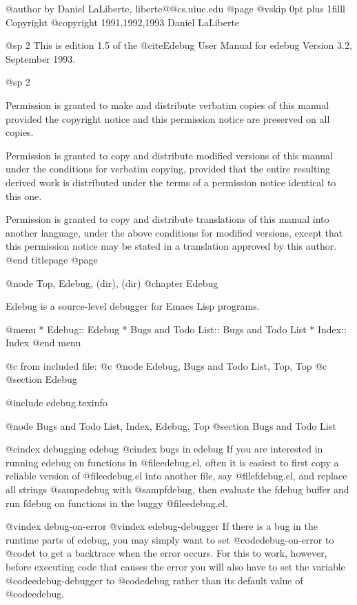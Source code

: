 @author by Daniel LaLiberte,  liberte@@cs.uiuc.edu
@page
@vskip 0pt plus 1filll
Copyright @copyright{} 1991,1992,1993 Daniel LaLiberte

@sp 2
This is edition 1.5 of the @cite{Edebug User Manual}
for edebug Version 3.2, September 1993.


@sp 2

Permission is granted to make and distribute verbatim copies of
this manual provided the copyright notice and this permission notice
are preserved on all copies.

Permission is granted to copy and distribute modified versions of this
manual under the conditions for verbatim copying, provided that the entire
resulting derived work is distributed under the terms of a permission
notice identical to this one.

Permission is granted to copy and distribute translations of this manual
into another language, under the above conditions for modified versions,
except that this permission notice may be stated in a translation approved
by this author.
@end titlepage
@page


@node Top, Edebug, (dir), (dir)
@chapter Edebug

  Edebug is a source-level debugger for Emacs Lisp programs.


@menu
* Edebug::			Edebug
* Bugs and Todo List::		Bugs and Todo List
* Index::			Index
@end menu

@c from included file:
@c @node Edebug, Bugs and Todo List, Top, Top
@c @section Edebug

@include edebug.texinfo


@node Bugs and Todo List, Index, Edebug, Top
@section Bugs and Todo List

@cindex debugging edebug
@cindex bugs in edebug
If you are interested in running edebug on functions in
@file{edebug.el}, often it is easiest to first copy a reliable version
of @file{edebug.el} into another file, say @file{fdebug.el}, and replace
all strings @samp{edebug} with @samp{fdebug}, then evaluate the fdebug
buffer and run fdebug on functions in the buggy @file{edebug.el}.

@vindex debug-on-error
@vindex edebug-debugger
If there is a bug in the runtime parts of edebug, you may simply want to
set @code{debug-on-error} to @code{t} to get a backtrace when the error
occurs.  For this to work, however, before executing code that causes
the error you will also have to set the variable @code{edebug-debugger}
to @code{debug} rather than its default value of @code{edebug}.

